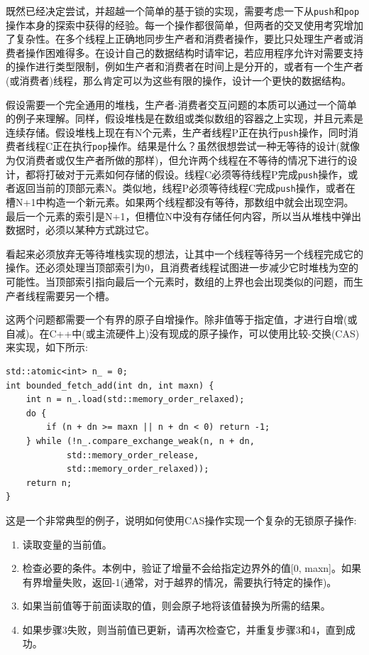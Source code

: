 
既然已经决定尝试，并超越一个简单的基于锁的实现，需要考虑一下从\texttt{push}和\texttt{pop}操作本身的探索中获得的经验。每一个操作都很简单，但两者的交叉使用考究增加了复杂性。在多个线程上正确地同步生产者和消费者操作，要比只处理生产者或消费者操作困难得多。在设计自己的数据结构时请牢记，若应用程序允许对需要支持的操作进行类型限制，例如生产者和消费者在时间上是分开的，或者有一个生产者(或消费者)线程，那么肯定可以为这些有限的操作，设计一个更快的数据结构。

假设需要一个完全通用的堆栈，生产者-消费者交互问题的本质可以通过一个简单的例子来理解。同样，假设堆栈是在数组或类似数组的容器之上实现，并且元素是连续存储。假设堆栈上现在有N个元素，生产者线程P正在执行\texttt{push}操作，同时消费者线程C正在执行\texttt{pop}操作。结果是什么？虽然很想尝试一种无等待的设计(就像为仅消费者或仅生产者所做的那样)，但允许两个线程在不等待的情况下进行的设计，都将打破对于元素如何存储的假设。线程C必须等待线程P完成\texttt{push}操作，或者返回当前的顶部元素N。类似地，线程P必须等待线程C完成\texttt{push}操作，或者在槽N+1中构造一个新元素。如果两个线程都没有等待，那数组中就会出现空洞。最后一个元素的索引是N+1，但槽位N中没有存储任何内容，所以当从堆栈中弹出数据时，必须以某种方式跳过它。

看起来必须放弃无等待堆栈实现的想法，让其中一个线程等待另一个线程完成它的操作。还必须处理当顶部索引为0，且消费者线程试图进一步减少它时堆栈为空的可能性。当顶部索引指向最后一个元素时，数组的上界也会出现类似的问题，而生产者线程需要另一个槽。

这两个问题都需要一个有界的原子自增操作。除非值等于指定值，才进行自增(或自减)。在C++中(或主流硬件上)没有现成的原子操作，可以使用比较-交换(CAS)来实现，如下所示:

\begin{lstlisting}[style=styleCXX]
std::atomic<int> n_ = 0;
int bounded_fetch_add(int dn, int maxn) {
	int n = n_.load(std::memory_order_relaxed);
	do {
		if (n + dn >= maxn || n + dn < 0) return -1;
	} while (!n_.compare_exchange_weak(n, n + dn,
			std::memory_order_release,
			std::memory_order_relaxed));
	return n;
}
\end{lstlisting}

这是一个非常典型的例子，说明如何使用CAS操作实现一个复杂的无锁原子操作:

\begin{enumerate}
\item 读取变量的当前值。
\item 检查必要的条件。本例中，验证了增量不会给指定边界外的值[0, maxn]。如果有界增量失败，返回-1(通常，对于越界的情况，需要执行特定的操作)。
\item 如果当前值等于前面读取的值，则会原子地将该值替换为所需的结果。
\item 如果步骤3失败，则当前值已更新，请再次检查它，并重复步骤3和4，直到成功。
\end{enumerate}

